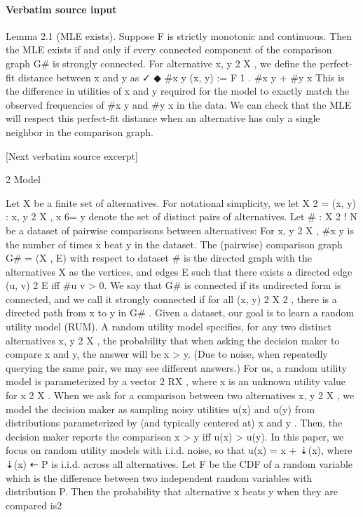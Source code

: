 \documentclass[10pt]{article}
\begin{document}
\paragraph{Verbatim source input}
\begin{ReviewVerbatim}
Lemma 2.1 (MLE exists). Suppose F is strictly monotonic and continuous. Then the MLE exists if
and only if every connected component of the comparison graph G# is strongly connected.
For alternative x, y 2 X , we define the perfect-fit distance between x and y as
                                            ✓                           ◆
                                                       #{x y}
                             (x, y) := F 1                                .
                                              #{x y} + #{y x}
This is the difference in utilities of x and y required for the model to exactly match the observed
frequencies of #{x y} and #{y x} in the data. We can check that the MLE will respect this
perfect-fit distance when an alternative has only a single neighbor in the comparison graph.

[Next verbatim source excerpt]

2       Model

Let X be a finite set of alternatives. For notational simplicity, we let X 2 = {(x, y) : x, y 2 X , x 6= y}
denote the set of distinct pairs of alternatives. Let # : X 2 ! N be a dataset of pairwise comparisons
between alternatives: For x, y 2 X , #{x y} is the number of times x beat y in the dataset.
The (pairwise) comparison graph G# = (X , E) with respect to dataset # is the directed graph with
the alternatives X as the vertices, and edges E such that there exists a directed edge (u, v) 2 E iff
#{u      v} > 0. We say that G# is connected if its undirected form is connected, and we call it
strongly connected if for all (x, y) 2 X 2 , there is a directed path from x to y in G# .
Given a dataset, our goal is to learn a random utility model (RUM). A random utility model specifies,
for any two distinct alternatives x, y 2 X , the probability that when asking the decision maker to
compare x and y, the answer will be x > y. (Due to noise, when repeatedly querying the same
pair, we may see different answers.) For us, a random utility model is parameterized by a vector
  2 RX , where x is an unknown utility value for x 2 X . When we ask for a comparison between
two alternatives x, y 2 X , we model the decision maker as sampling noisy utilities u(x) and u(y)
from distributions parameterized by (and typically centered at) x and y . Then, the decision maker
reports the comparison x > y iff u(x) > u(y).
In this paper, we focus on random utility models with i.i.d. noise, so that u(x) = x + ⇣(x), where
⇣(x) ⇠ P is i.i.d. across all alternatives. Let F be the CDF of a random variable which is the
difference between two independent random variables with distribution P. Then the probability that
alternative x beats y when they are compared is2


\end{ReviewVerbatim}
\end{document}
